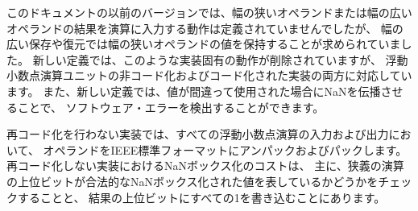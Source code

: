 \begin{commentary}
\begin{comment}
Earlier versions of this document did not define the behavior of
feeding the results of narrower or wider operands into an operation,
except to require that wider saves and restores would preserve the
value of a narrower operand.  The new definition removes this
implementation-specific behavior, while still accommodating both
non-recoded and recoded implementations of the floating-point unit.
The new definition also helps catch software errors by propagating
NaNs if values are used incorrectly.
\end{comment}

このドキュメントの以前のバージョンでは、幅の狭いオペランドまたは幅の広いオペランドの結果を演算に入力する動作は定義されていませんでしたが、
幅の広い保存や復元では幅の狭いオペランドの値を保持することが求められていました。 
新しい定義では、このような実装固有の動作が削除されていますが、
浮動小数点演算ユニットの非コード化およびコード化された実装の両方に対応しています。
また、新しい定義では、値が間違って使用された場合にNaNを伝播させることで、
ソフトウェア・エラーを検出することができます。

\begin{comment}
Non-recoded implementations unpack and pack the operands to IEEE
standard format on the input and output of every floating-point
operation.  The NaN-boxing cost to a non-recoded implementation is
primarily in checking if the upper bits of a narrower operation
represent a legal NaN-boxed value, and in writing all 1s to the upper
bits of a result.
\end{comment}

再コード化を行わない実装では、すべての浮動小数点演算の入力および出力において、
オペランドをIEEE標準フォーマットにアンパックおよびパックします。 
再コード化しない実装におけるNaNボックス化のコストは、
主に、狭義の演算の上位ビットが合法的なNaNボックス化された値を表しているかどうかをチェックすることと、
結果の上位ビットにすべての1を書き込むことにあります。

\begin{comment}
Recoded implementations use a more convenient internal format to
represent floating-point values, with an added exponent bit to allow
all values to be held normalized.  The cost to the recoded
implementation is primarily the extra tagging needed to track the
internal types and sign bits, but this can be done without adding new
state bits by recoding NaNs internally in the exponent field.  Small
modifications are needed to the pipelines used to transfer values in
and out of the recoded format, but the datapath and latency costs are
minimal.  The recoding process has to handle shifting of input
subnormal values for wide operands in any case, and extracting the
NaN-boxed value is a similar process to normalization except for
skipping over leading-1 bits instead of skipping over leading-0 bits,
allowing the datapath muxing to be shared.
\end{comment}


\end{commentary}
